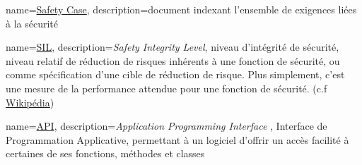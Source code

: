 {
	name=\underline{Safety Case},
	description={document indexant l'ensemble de exigences liées à la sécurité}
	}
	
{
	name=\underline{SIL},
	description={\textit{Safety Integrity Level}, niveau d'intégrité de sécurité, niveau relatif de réduction de risques inhérents à une fonction de sécurité, ou comme spécification d'une cible de réduction de risque. Plus simplement, c'est une mesure de la performance attendue pour une fonction de sécurité. (c.f \underline{\href{https://fr.wikipedia.org/wiki/Safety_Integrity_Level}{Wikipédia}})}
}

{
	name=\underline{API},
	description={\textit{Application Programming Interface }, Interface de Programmation Applicative, permettant à un logiciel d'offrir un accès facilité à certaines de ses fonctions, méthodes et classes}
}



\glsaddall

